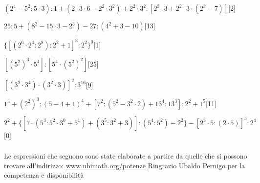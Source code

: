 \begin{esercizio} \label{ese:1.17}
\((2^4-5^2:5\cdot3):1+(2\cdot3\cdot6-2^2\cdot3^2)+2^2\cdot3^2:[2^3\cdot3+2^2\cdot3\cdot(2^3-7)]\)\hfill[2]
\end{esercizio}
\begin{esercizio} \label{ese:1.17}
\(25:5+(8^2-15\cdot3-2^3)-27:(4^2+3-10)\)\hfill[13]
\end{esercizio}
\begin{esercizio} \label{ese:1.17}
\(\{[(2^6\cdot2^4:2^8):2^2+1]^3:2^2\}^0\)\hfill[1]
\end{esercizio}
\begin{esercizio} \label{ese:1.17}
\([(5^2)^3\cdot5^4]:[5^4\cdot(5^2)^2]\)\hfill[25]
\end{esercizio}
\begin{esercizio} \label{ese:1.17}
\([(3^2\cdot3^4)\cdot(3^2\cdot3)]^2:3^{16}\)\hfill[9]
\end{esercizio}
\begin{esercizio} \label{ese:1.17}
\(1^3+(2^2)^3:(5-4+1)^4+[7^2:(5^2-3^2\cdot2)+13^4:13^3]:2^2+1^5\)\hfill[11]
\end{esercizio}
\begin{esercizio} \label{ese:1.17}
\(2^2+\{[7\cdot(5^3:5^2\cdot3^0+5^1)+(3^5:3^2+3)]:(5^4:5^2)-2^2\}-[2^3\cdot5:(2\cdot5)]^3:2^4\)\hfill[0]
\end{esercizio}

\subsubsection*{}


Le espressioni che seguono sono state elaborate a partire da quelle che si 
possono trovare all'indirizzo:
\href{http:// www.ubimath.org/potenze}{ www.ubimath.org/potenze}
Ringrazio Ubaldo Pernigo per la competenza e disponibilità

